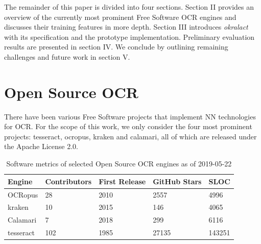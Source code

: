 \documentclass[conference]{IEEEtran}
\begin{document}


The remainder of this paper is divided into four sections. Section
II provides an overview of the currently most prominent Free
Software OCR engines and discusses their training features in more
depth. Section III introduces \textit{okralact} with its
specification and the prototype implementation. Preliminary
evaluation results are presented in section IV. We conclude by outlining 
remaining challenges and future work in section V. 

\section{Open Source OCR}

There have been various Free Software projects that implement NN technologies
for OCR. For the scope of this work, we only consider the four most prominent projects: tesseract, ocropus, kraken and calamari, all of which are released under the Apache License 2.0.


\begin{table}[b]
\begin{tabular}{lllll}
\hline
Engine    & Contributors & First Release & GitHub Stars & SLOC \\ \hline
OCRopus   & 28           & 2010          & 2557         & 4996 \\
kraken    & 10           & 2015          & 146          & 4065 \\
Calamari  & 7            & 2018          & 299          & 6116 \\
tesseract & 102          & 1985          & 27135        & 143251 \\

\end{tabular}
\caption{Software metrics of selected Open Source OCR engines as of 2019-05-22}
\label{tab:stats}
\end{table}
\end{document}
